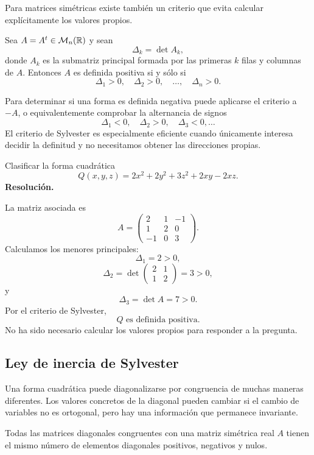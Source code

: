 Para matrices simétricas existe también un criterio que evita calcular explícitamente los valores propios.

\begin{theorem}
Sea $A=A^t\in\mathcal M_n(\mathbb{R})$ y sean
\[
\Delta_k=\det A_k,
\]
donde $A_k$ es la submatriz principal formada por las primeras $k$ filas y columnas de $A$. Entonces $A$ es definida positiva si y sólo si
\[
\Delta_1>0,\quad\Delta_2>0,\quad\ldots,\quad\Delta_n>0.
\]
\end{theorem}

Para determinar si una forma es definida negativa puede aplicarse el criterio a $-A$, o equivalentemente comprobar la alternancia de signos
\[
\Delta_1<0,\quad\Delta_2>0,\quad\Delta_3<0,\ldots
\]
El criterio de Sylvester es especialmente eficiente cuando únicamente interesa decidir la definitud y no necesitamos obtener las direcciones propias.

\begin{solvedexercise}
Clasificar la forma cuadrática
\[
Q(x,y,z)=2x^2+2y^2+3z^2+2xy-2xz.
\]
\tcblower
\textbf{Resolución.}\par\smallskip
La matriz asociada es
\[
A=\begin{pmatrix}
2&1&-1\\
1&2&0\\
-1&0&3
\end{pmatrix}.
\]
Calculamos los menores principales:
\[
\Delta_1=2>0,
\]
\[
\Delta_2=\det\begin{pmatrix}2&1\\1&2\end{pmatrix}=3>0,
\]
y
\[
\Delta_3=\det A=7>0.
\]
Por el criterio de Sylvester,
\[
\boxed{Q\text{ es definida positiva}.}
\]
No ha sido necesario calcular los valores propios para responder a la pregunta.
\end{solvedexercise}

\subsection{Ley de inercia de Sylvester}

Una forma cuadrática puede diagonalizarse por congruencia de muchas maneras diferentes. Los valores concretos de la diagonal pueden cambiar si el cambio de variables no es ortogonal, pero hay una información que permanece invariante.

\begin{theorem}
Todas las matrices diagonales congruentes con una matriz simétrica real $A$ tienen el mismo número de elementos diagonales positivos, negativos y nulos.
\end{theorem}


